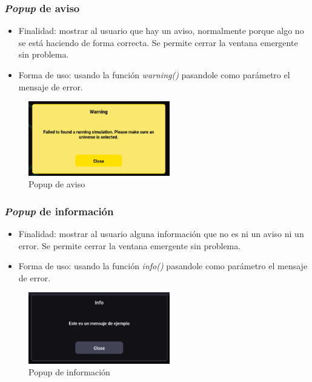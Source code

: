 \subsubsection{\textit{Popup} de aviso}
\begin{itemize}
    \item Finalidad: mostrar al usuario que hay un aviso, normalmente porque algo no se está haciendo de forma correcta. Se permite cerrar la ventana emergente sin problema.
    \item Forma de uso: usando la función \textit{warning()} pasandole como parámetro el mensaje de error.
\end{itemize}
\begin{figure}[H]
    \centering
    \includegraphics[width=0.55\textwidth]{figures/bt-avances/warning.png}
    \caption{Popup de aviso}
    \label{fig:bt-warn}
\end{figure}

\subsubsection{\textit{Popup} de información}
\begin{itemize}
    \item Finalidad: mostrar al usuario alguna información que no es ni un aviso ni un error. Se permite cerrar la ventana emergente sin problema.
    \item Forma de uso: usando la función \textit{info()} pasandole como parámetro el mensaje de error.
\end{itemize}
\begin{figure}[H]
    \centering
    \includegraphics[width=0.55\textwidth]{figures/bt-avances/info.png}
    \caption{Popup de información}
    \label{fig:bt-info}
\end{figure}

